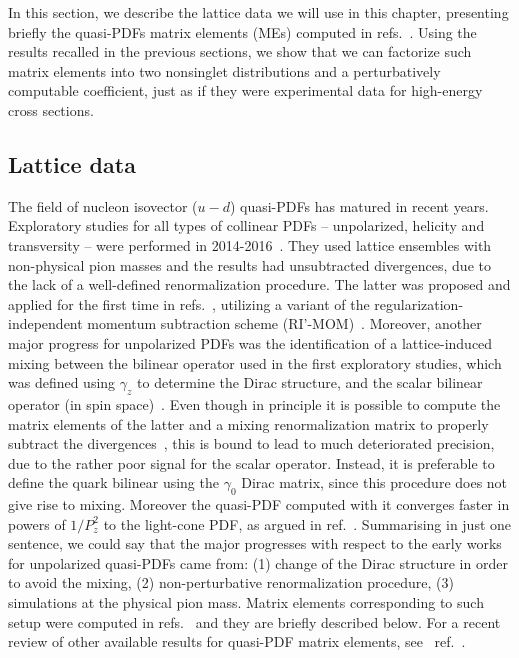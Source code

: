 In this section, we describe the lattice data we will use in this chapter, presenting
briefly the quasi-PDFs matrix elements (MEs) computed in
refs.~\cite{Alexandrou:2018pbm, Alexandrou:2019lfo}. Using the results recalled
in the previous sections, we show that we can factorize such matrix
elements into two nonsinglet distributions and a perturbatively computable
coefficient, just as if they were experimental data for high-energy cross
sections.

\subsection{Lattice data}
\label{subsec:latticedata}
The field of nucleon isovector ($u-d$) quasi-PDFs has matured in recent years.
Exploratory studies for all types of collinear PDFs -- unpolarized, helicity and
transversity -- were performed in
2014-2016~\cite{Lin:2014zya,Alexandrou:2015rja,Chen:2016utp,Alexandrou:2016jqi}.
They used lattice ensembles with non-physical pion masses and the results had
unsubtracted divergences, due to the lack of a well-defined renormalization
procedure. The latter was proposed and applied for the first time in
refs.~\cite{Constantinou:2017sej,Alexandrou:2017huk}, utilizing a variant of the
regularization-independent momentum subtraction scheme
(RI'-MOM)~\cite{Martinelli:1994ty}. Moreover, another major progress for
unpolarized PDFs was the identification of a lattice-induced mixing between the
bilinear operator used in the first exploratory studies, which was defined using
$\gamma_z$ to determine the Dirac structure, and the scalar bilinear operator
(in spin space)~\cite{Constantinou:2017sej}. Even though in principle it is
possible to compute the matrix elements of the latter and a mixing
renormalization matrix to properly subtract the
divergences~\cite{Alexandrou:2017huk}, this is bound to lead to much
deteriorated precision, due to the rather poor signal for the scalar operator.
Instead, it is preferable to define the quark bilinear using the $\gamma_0$
Dirac matrix, since this procedure does not give rise to mixing. Moreover the
quasi-PDF computed with it converges faster in powers of $1/P_z^2$ to the
light-cone PDF, as argued in ref.~\cite{Radyushkin:2016hsy}. Summarising in just
one sentence, we could say that the major progresses with respect to the early
works for unpolarized quasi-PDFs came from: (1) change of the Dirac structure in
order to avoid the mixing, (2) non-perturbative renormalization procedure, (3)
simulations at the physical pion mass. Matrix elements corresponding to such
setup were computed in refs.~\cite{Alexandrou:2018pbm,Alexandrou:2019lfo,Chen:2018xof} and they are briefly
described below. For a recent review of other available results for quasi-PDF
matrix elements, see \eg\ ref.~\cite{Cichy:2018mum}. 

